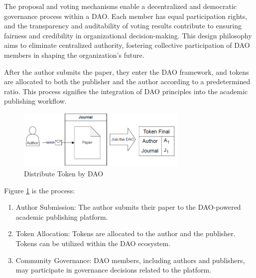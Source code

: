 \documentclass[lettersize,journal]{IEEEtran}
\begin{document}
The proposal and voting mechanisms enable a decentralized and democratic governance process within a DAO. Each member has equal participation rights, and the transparency and auditability of voting results contribute to ensuring fairness and credibility in organizational decision-making. This design philosophy aims to eliminate centralized authority, fostering collective participation of DAO members in shaping the organization's future.


After the author submits the paper, they enter the DAO framework, and tokens are allocated to both the publisher and the author according to a predetermined ratio. This process signifies the integration of DAO principles into the academic publishing workflow.

\begin{figure}[h]
  \centering
  \includegraphics[width=3.2in]{assets/daopaper.png}
  \caption{Distribute Token by DAO}
  \label{fig:distributetoken}
\end{figure}

Figure \ref{fig:distributetoken} is the process:

\begin{enumerate}
  \item Author Submission: The author submits their paper to the DAO-powered academic publishing platform.
  \item Token Allocation: Tokens are allocated to the author and the publisher. Tokens can be utilized within the DAO ecosystem. 
  \item Community Governance: DAO members, including authors and publishers, may participate in governance decisions related to the platform. 
\end{enumerate}
\end{document}
